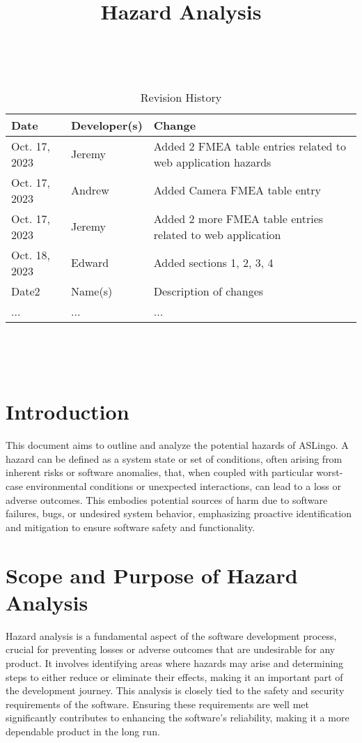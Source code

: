 \documentclass{article}
\title{Hazard Analysis\\\progname}
\author{\authname}
\date{}
\begin{document}
\maketitle
\thispagestyle{empty}

~\newpage


\begin{table}[hp]
\caption{Revision History} \label{TblRevisionHistory}
\begin{tabularx}{\textwidth}{llX}
\toprule
\textbf{Date} & \textbf{Developer(s)} & \textbf{Change}\\
\midrule
Oct. 17, 2023 & Jeremy & Added 2 FMEA table entries related to web application hazards\\
Oct. 17, 2023 & Andrew & Added Camera FMEA table entry\\
Oct. 17, 2023 & Jeremy & Added 2 more FMEA table entries related to web application\\
Oct. 18, 2023 & Edward & Added sections 1, 2, 3, 4\\
Date2 & Name(s) & Description of changes\\
... & ... & ...\\
\bottomrule
\end{tabularx}
\end{table}

~\newpage

\tableofcontents

~\newpage


\section{Introduction}
This document aims to outline and analyze the potential hazards of ASLingo. A hazard can be defined as a system state or set of conditions, often arising from inherent risks or software anomalies, that, when coupled with particular worst-case environmental conditions or unexpected interactions, can lead to a loss or adverse outcomes. This embodies potential sources of harm due to software failures, bugs, or undesired system behavior, emphasizing proactive identification and mitigation to ensure software safety and functionality.

\section{Scope and Purpose of Hazard Analysis}
Hazard analysis is a fundamental aspect of the software development process, crucial for preventing losses or adverse outcomes that are undesirable for any product. It involves identifying areas where hazards may arise and determining steps to either reduce or eliminate their effects, making it an important part of the development journey. This analysis is closely tied to the safety and security requirements of the software. Ensuring these requirements are well met significantly contributes to enhancing the software's reliability, making it a more dependable product in the long run.
\end{document}
